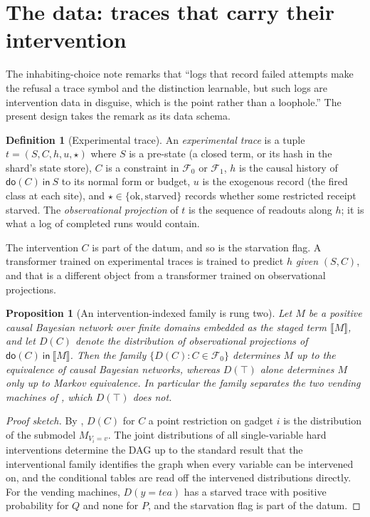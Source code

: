 \documentclass[11pt]{article}
\theoremstyle{plain}
\newtheorem{proposition}[theorem]{Proposition}
\theoremstyle{definition}
\newtheorem{definition}[theorem]{Definition}
\theoremstyle{remark}
\newcommand{\sem}[1]{\llbracket #1 \rrbracket}
\newcommand{\dok}{\textsf{do}}
\newcommand{\ink}{\textsf{in}}
\begin{document}
\section{The data: traces that carry their intervention}\label{sec:data}

The inhabiting-choice note remarks that ``logs that record failed attempts make
the refusal a trace symbol and the distinction learnable, but such logs are
intervention data in disguise, which is the point rather than a loophole.''
The present design takes the remark as its data schema.

\begin{definition}[Experimental trace]\label{def:trace}
An \emph{experimental trace} is a tuple $t = (S, C, h, u, \star)$ where $S$ is
a pre-state (a closed term, or its hash in the shard's state store), $C$ is a
constraint in $\mathcal{F}_0$ or $\mathcal{F}_1$, $h$ is the causal history of
$\dok(C)\ \ink\ S$ to its normal form or budget, $u$ is the exogenous record
(the fired class at each site), and $\star \in \{\mathrm{ok}, \mathrm{starved}\}$
records whether some restricted receipt starved. The \emph{observational
projection} of $t$ is the sequence of readouts along $h$; it is what a log of
completed runs would contain.
\end{definition}

The intervention $C$ is part of the datum, and so is the starvation flag. A
transformer trained on experimental traces is trained to predict $h$ \emph{given}
$(S, C)$, and that is a different object from a transformer trained on
observational projections.

\begin{proposition}[An intervention-indexed family is rung two]\label{prop:rungtwo}
Let $M$ be a positive causal Bayesian network over finite domains embedded as
the staged term $\sem{M}$, and let $D(C)$ denote the distribution of
observational projections of $\dok(C)\ \ink\ \sem{M}$. Then the family
$\{D(C) : C \in \mathcal{F}_0\}$ determines $M$ up to the equivalence of
causal Bayesian networks, whereas $D(\top)$ alone determines $M$ only up to
Markov equivalence. In particular the family separates the two vending machines
of \cite[\S4.6]{Inhabiting}, which $D(\top)$ does not.
\end{proposition}

\begin{proof}[Proof sketch]
By \cite[Thm.~5.3]{Interventions}, $D(C)$ for $C$ a point restriction on
gadget $i$ is the distribution of the submodel $M_{V_i = v}$. The joint
distributions of all single-variable hard interventions determine the DAG up to
the standard result that the interventional family identifies the graph when
every variable can be intervened on, and the conditional tables are read off the
intervened distributions directly. For the vending machines, $D(y = \mathit{tea})$
has a starved trace with positive probability for $Q$ and none for $P$, and the
starvation flag is part of the datum.
\end{proof}
\end{document}
